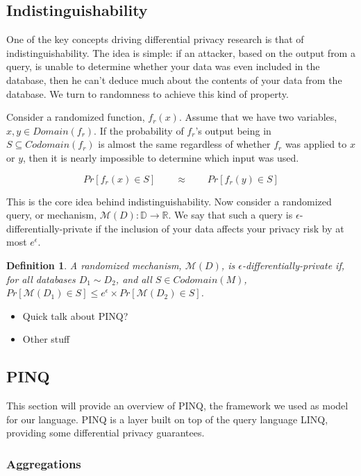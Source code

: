 \documentclass[12pt]{article}
\newtheorem{defn}{Definition}[section]
\begin{document}
\subsection{Indistinguishability}

One of the key concepts driving differential privacy research is that of indistinguishability.
The idea is simple: if an attacker, based on the output from a query, is unable to determine whether your data was even included in the database, then he can't deduce much about the contents of your data from the database.
We turn to randomness to achieve this kind of property.

Consider a randomized function, $f_r(x)$.
Assume that we have two variables, $x, y \in Domain(f_r)$.
If the probability of $f_r$'s output being in $S \subseteq Codomain(f_r)$ is almost the same regardless of whether $f_r$ was applied to $x$ or $y$, then it is nearly impossible to determine which input was used.

\[
  Pr[f_r(x)\in S] \qquad\approx\qquad  Pr[f_r(y)\in S]
\]

This is the core idea behind indistinguishability.
Now consider a randomized query, or mechanism, $\mathcal{M}(D) : \mathbb{D} \rightarrow \mathbb{R}$.
We say that such a query is $\epsilon$-differentially-private if the inclusion of your data affects your privacy risk by at most $e^\epsilon$.

\begin{defn}\label{def:diffpriv}
  A randomized mechanism, $\mathcal{M}(D)$, is $\epsilon$-differentially-private if, for all databases $D_1 \sim D_2$, and all $S \in Codomain(M)$,
  $Pr[\mathcal{M}(D_1)\in S] \le e^\epsilon \times Pr[\mathcal{M}(D_2)\in S]$.
\end{defn}

\begin{itemize}
  \item Quick talk about PINQ?
  \item Other stuff
\end{itemize}

\subsection{PINQ}\label{sec:pinq}

This section will provide an overview of PINQ, the framework we used as model for our language.
PINQ is a layer built on top of the query language LINQ, providing some differential privacy guarantees.

\subsubsection{Aggregations}
\end{document}
